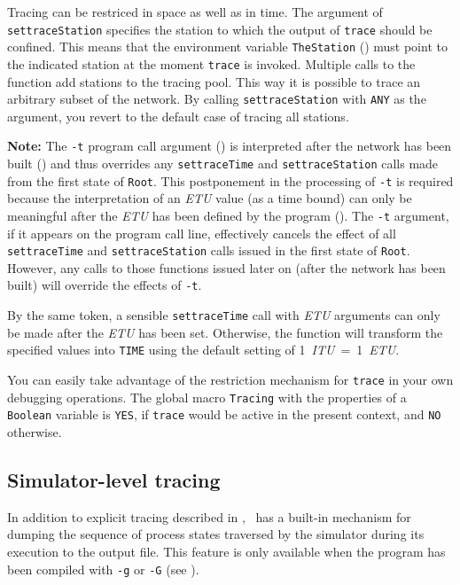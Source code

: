 Tracing can be restriced in space as well as in time.
The argument of {\tt settraceStation} specifies the station to which the
output of {\tt trace} should be confined.
This means that the environment variable {\tt TheStation} ()
must point to the indicated station at the moment {\tt trace} is invoked.
Multiple calls to the function add stations to the tracing pool.
This way it is possible to trace an arbitrary subset of the network.
By calling {\tt settraceStation} with {\tt ANY} as the argument,
you revert to the default case of tracing all stations.

\noindent
{\bf Note:}
The {\tt -t} program call argument () is interpreted after
the network has been built ()
and thus overrides any {\tt settraceTime} and
{\tt settraceStation} calls made from the first state of {\tt Root}.
This postponement in the processing of {\tt -t} is required because the
interpretation of an {\em ETU\/} value (as a time bound)
can only be meaningful after the {\em ETU\/} has been defined by the program
().
The {\tt -t} argument, if it appears on the program call line, effectively
cancels the effect of all {\tt settraceTime} and {\tt settraceStation}
calls issued in the first state of {\tt Root}.
However, any calls to those functions issued later on (after
the network has been built) will override the effects of {\tt -t}.

\noindent
By the same token, a sensible {\tt settraceTime} call with
{\em ETU\/} arguments can only be made after the {\em ETU\/} has been set.
Otherwise, the function will transform the specified values into {\tt TIME}
using the default setting of 1~{\em ITU\/}~=~1~{\em ETU}.

\medskip

You can easily take advantage of the restriction mechanism for
{\tt trace} in your own debugging operations.
The global macro {\tt Tracing} with the properties of a {\tt Boolean}
variable is {\tt YES}, if {\tt trace} would be active in the present context,
and {\tt NO} otherwise.

\subsection{Simulator-level tracing}
\label{rm_ob_st}

In addition to explicit tracing described in , \smurph\ has
a built-in mechanism for dumping the sequence of process states traversed
by the simulator during its execution to the output file.
This feature is only available when the program has been compiled with
{\tt -g} or {\tt -G} (see ).

